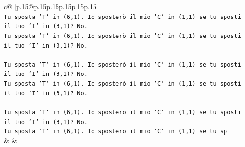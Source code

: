 \documentclass{article}
\begin{document}
{\begin{supertabular}{c@{$\;$}|p{.15\linewidth}@{}p{.15\linewidth}p{.15\linewidth}p{.15\linewidth}p{.15\linewidth}p{.15\linewidth}}
{{{\\ 
\texttt{Tu sposta 'T' in (6,1). Io sposterò il mio 'C' in (1,1) se tu sposti il tuo 'I' in (3,1)? No.} \\
\texttt{Tu sposta 'T' in (6,1). Io sposterò il mio 'C' in (1,1) se tu sposti il tuo 'I' in (3,1)? No.} \\
\\ 
\texttt{Tu sposta 'T' in (6,1). Io sposterò il mio 'C' in (1,1) se tu sposti il tuo 'I' in (3,1)? No.} \\
\texttt{Tu sposta 'T' in (6,1). Io sposterò il mio 'C' in (1,1) se tu sposti il tuo 'I' in (3,1)? No.} \\
\\ 
\texttt{Tu sposta 'T' in (6,1). Io sposterò il mio 'C' in (1,1) se tu sposti il tuo 'I' in (3,1)? No.} \\
\texttt{Tu sposta 'T' in (6,1). Io sposterò il mio 'C' in (1,1) se tu sp} \\
            }
        }
    }
    & & \\ \\


\end{supertabular}}
\end{document}
